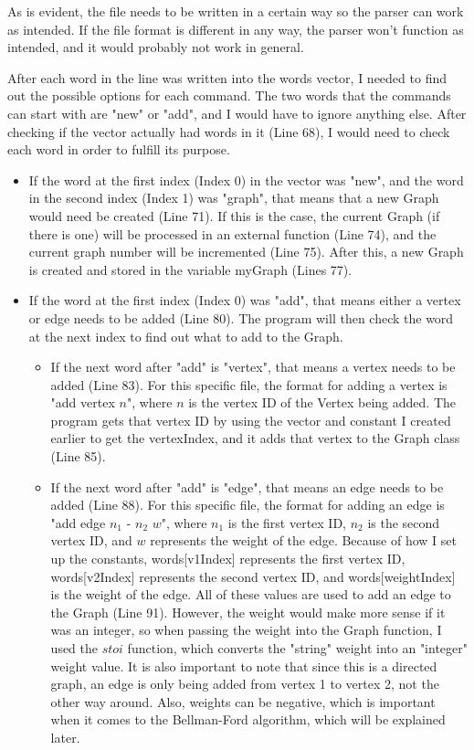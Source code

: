 \documentclass[letterpaper, 10pt]{article}
\begin{document}
\noindent
As is evident, the file needs to be written in a certain way so the parser can work as intended. If the file format is different in any way, the parser won't function as intended, and it would probably not work in general.

\vspace{1em}
\noindent
After each word in the line was written into the words vector, I needed to find out the possible options for each command. The two words that the commands can start with are "new" or "add", and I would have to ignore anything else. After checking if the vector actually had words in it (Line 68), I would need to check each word in order to fulfill its purpose.

\begin{itemize}
    \item If the word at the first index (Index 0) in the vector was "new", and the word in the second index (Index 1) was "graph", that means that a new Graph would need be created (Line 71). If this is the case, the current Graph (if there is one) will be processed in an external function (Line 74), and the current graph number will be incremented (Line 75). After this, a new Graph is created and stored in the variable myGraph (Lines 77).
    \item If the word at the first index (Index 0) was "add", that means either a vertex or edge needs to be added (Line 80). The program will then check the word at the next index to find out what to add to the Graph.
    \begin{itemize}
        \item If the next word after "add" is "vertex", that means a vertex needs to be added (Line 83). For this specific file, the format for adding a vertex is "add vertex $n$", where $n$ is the vertex ID of the Vertex being added. The program gets that vertex ID by using the vector and constant I created earlier to get the vertexIndex, and it adds that vertex to the Graph class (Line 85).
        \item If the next word after "add" is "edge", that means an edge needs to be added (Line 88). For this specific file, the format for adding an edge is "add edge $n_1$ - $n_2$ $w$", where $n_1$ is the first vertex ID, $n_2$ is the second vertex ID, and $w$ represents the weight of the edge. Because of how I set up the constants, words[v1Index] represents the first vertex ID, words[v2Index] represents the second vertex ID, and words[weightIndex] is the weight of the edge. All of these values are used to add an edge to the Graph (Line 91). However, the weight would make more sense if it was an integer, so when passing the weight into the Graph function, I used the $stoi$ function, which converts the "string" weight into an "integer" weight value. It is also important to note that since this is a directed graph, an edge is only being added from vertex 1 to vertex 2, not the other way around. Also, weights can be negative, which is important when it comes to the Bellman-Ford algorithm, which will be explained later.
    \end{itemize}
\end{itemize}
\end{document}
